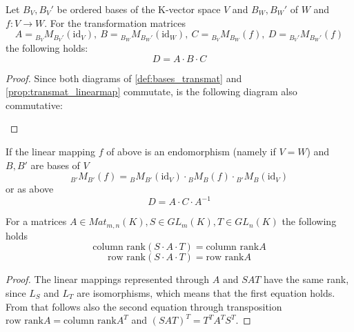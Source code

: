 \begin{proposition}\label{pro:transmat_mm}
   Let \(B_{V}, B_{V}'\) be ordered bases of the K-vector space \(V\) and \(B_{W}, B_{W}'\) of \(W\) and \(f: V \to W\).
   For the transformation matrices
   \[A = {}_{B_{V}}M_{B_{V}'}(\text{id}_{V}), ~ B = {}_{B_{W}}M_{B_{W}'}(\text{id}_{W}), ~ C = {}_{B_{V}}M_{B_{W}}(f), ~ D = {}_{B_{V}'}M_{B_{W}'}(f)\]
   the following holds:
   \[D = A \cdot B \cdot C\]
\end{proposition}
\begin{proof}
   Since both diagrams of \cref{def:bases_transmat} and \cref{prop:transmat_linearmap} commutate, is the following diagram also commutative:
   \begin{center}
   \end{center}
\end{proof}

\begin{corollary}
   If the linear mapping \(f\) of above is an endomorphism (namely if \(V = W\)) and \(B, B'\) are bases of \(V\)
   \[{}_{B'}M_{B'}(f) = {}_{B}M_{B'}(\text{id}_{V}) \cdot {}_{B}M_{B}(f) \cdot {}_{B'}M_{B}(\text{id}_{V})\]
   or as above
   \[D = A \cdot C \cdot A^{-1}\]
\end{corollary}

\begin{lemma}\label{lem:rowrank=colrank}
   For a matrices \(A \in Mat_{m,n}(K), S \in GL_m(K), T \in GL_n(K)\) the following holds
   \[\text{column rank}(S \cdot A \cdot T) = \text{column rank} A\]
   \[\text{row rank}(S \cdot A \cdot T) = \text{row rank} A\]
\end{lemma}
\begin{proof}
   The linear mappings represented through \(A\) and \(SAT\) have the same rank, since \(L_{S}\) and \(L_{T}\) are isomorphisms, which means that the first equation holds.
   From that follows also the second equation through transposition \(\text{row rank} A = \text{column rank} A^{T}\) and \((SAT)^T = T^T A^T S^T\).
\end{proof}

